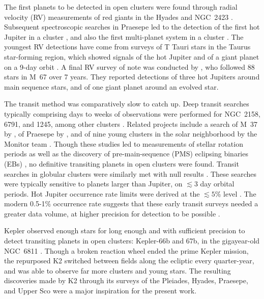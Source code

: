 \documentclass[12pt,twocolumn,tighten]{aastex62}
\begin{document}
The first planets to be detected in open clusters were found through
radial velocity (RV) measurements of red giants in the Hyades and
NGC~2423 \citep{Sato_et_al_2007,lovis_mayor_2007}.
Subsequent spectroscopic searches in Praesepe led to the detection of
the first hot Jupiter in a cluster \citep{Quinn_et_al_2012}, and also
the first multi-planet system in a cluster \citep{Malavolta_et_al_2016}.
The youngest RV detections have come from surveys of T Tauri stars in the
Taurus star-forming region, which showed signals of the hot Jupiter
\citep[V830~Tau~b][]{donati_hj_2016} and of a giant planet on a 9-day orbit
\citep[CI~Tau~b][]{johns-krull_candidate_2016,flagg_co_2019}.
A final RV survey of note was conducted by
\citet{brucalassi_search_2017}, who followed 88 stars in M~67 over 7
years.  They reported detections of three hot Jupiters around main
sequence stars, and of one giant planet around an evolved star.

The transit method was comparatively slow to catch up.  Deep transit
searches typically comprising days to weeks of observations were
performed for NGC~2158, 6791, and 1245, among other clusters
\citep{mochejska_planets_2005,mochejska_planets_2006,burke_survey_2006}.
Related projects include a search of M~37 by
\citet{hartman_MMT_IV_2009}, of Praesepe by
\citet{pepper_photometric_2008}, and of nine young clusters in the
solar neighborhood by the Monitor team
\citep{aigrain_monitor_2007,irwin_monitordata_2007,miller_monitor_2008}.
Though these studies led to measurements of stellar rotation periods
\citep{hartman_rotation_2009,Irwin_NGC2516_2007} as well as the
discovery of pre-main-sequence (PMS) eclipsing binaries (EBs)
\citep{irwin_monitor_PMSEB_2007}, no definitive transiting planets in
open clusters were found.  Transit searches in globular clusters were
similarly met with null results \citep{gilliland_lack_2000,
weldrake_searching_2006}.  These searches were typically sensitive to
planets larger than Jupiter, on $\lesssim 3$ day orbital periods.  Hot
Jupiter occurrence rate limits were derived at the $\lesssim 5\%$
level \citep[{\it e.g.},][]{burke_survey_2006, hartman_MMT_IV_2009}.
The modern 0.5-1\% occurrence rate suggests that these early transit
surveys needed a greater data volume, at higher precision for
detection to be possible
\citep{mayor_harps_2011,wright_frequency_2012,howard_planet_2012,petigura_metallicity_2018}.

Kepler \citep{borucki_kepler_2010} observed enough stars for long
enough and with sufficient precision to detect transiting planets in
open clusters:  Kepler-66b and 67b, in the gigayear-old NGC~6811
\citep{Meibom_et_al_2013}.  Though a broken reaction wheel ended the
prime Kepler mission, the repurposed K2 \citep{howell_k2_2014}
switched between fields along the ecliptic every quarter-year, and was
able to observe far more clusters and young stars.  The resulting
discoveries made by K2 through its surveys of the Pleiades, Hyades,
Praesepe, and Upper Sco were a major inspiration for the present work.
\end{document}
